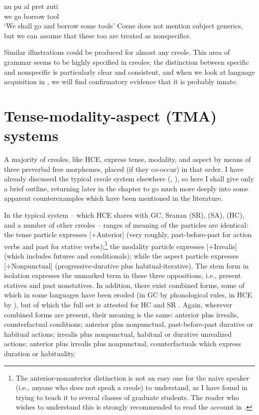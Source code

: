 \ea\label{ex:2:26}
 \gll nu pu al pret zuti\\
we {\IRR} go borrow tool \\
\glt `We shall go and borrow some tools'
\z
Corne does not mention subject generics, but we can assume that these too are treated as nonspecifics.

Similar illustrations could be produced for almost any creole. This area of grammar seems to be highly specified in creoles; the dis\-tinction between specific and nonspecific is particularly clear and consistent, and when we look at language acquisition in , we will find confirmatory evidence that it is probably innate.

\section{Tense-modality-aspect (TMA) systems}

A majority of creoles, like HCE, express tense, modality, and aspect by means of three preverbal free morphemes, placed (if they co-occur) in that order. I have already discussed the typical creole system elsewhere (\citealt{Bickerton1974}, \citeyear[Chapter 2]{Bickerton1975}), so here I shall give only a brief outline, returning later in the chapter to go much more deeply into some apparent counterexamples which have been men\-tioned in the literature.

In the typical system -- which HCE shares with GC, Sranan (SR),  (SA),  (HC), and a number of other creoles -- ranges of meaning of the particles are identical: the tense particle ex\-presses [+Anterior] (very roughly, past-before-past for action verbs and past for stative verbs);\footnote{The anterior-nonanterior distinction is not an easy one for the naive speaker (i.e., anyone who does not speak a creole) to under\-stand, as I have found in trying to teach it to several classes of graduate students. The reader who wishes to understand this is strongly recom\-mended to read the account in \citet[Chapter 2]{Bickerton1975}.} the modality particle expresses [+Irrealis] (which includes futures and conditionals); while the aspect particle expresses [+Nonpunctual] (progressive-durative plus habitual-iterative). The stem form in isolation expresses the unmarked term in these three oppositions, i.e., present statives and past nonstatives. In addition, there exist combined forms, some of which in some languages have been eroded (in GC by phonological rules, in HCE by ), but of which the full set is attested for HC \citep{Hall1953} and SR \citep{Voorhoeve1957}. Again, wherever combined forms are present, their meaning is the same: anterior plus irrealis, counterfactual conditions; anterior plus nonpunctual, past-before-past durative or habitual actions; irrealis plus nonpunctual, habitual or durative unrealized actions; anterior plus irrealis plus nonpunctual, counterfactuals which express duration or habituality.

